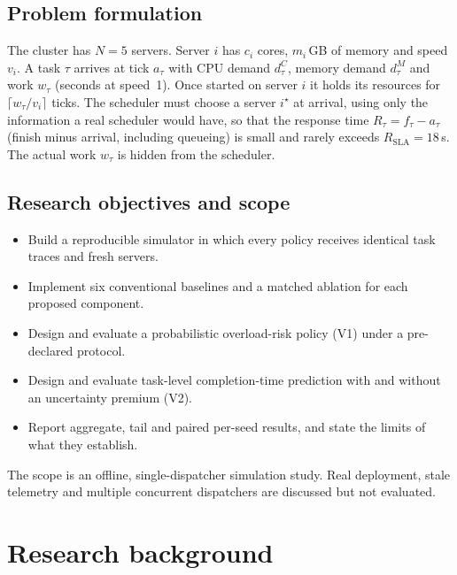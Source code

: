 \documentclass[11pt,a4paper]{article}
\begin{document}
\subsection{Problem formulation}
The cluster has $N=5$ servers. Server $i$ has $c_i$ cores, $m_i$\,GB of memory and speed $v_i$. A task
$\tau$ arrives at tick $a_\tau$ with CPU demand $d^{C}_\tau$, memory demand $d^{M}_\tau$ and work
$w_\tau$ (seconds at speed~1). Once started on server $i$ it holds its resources for
$\lceil w_\tau / v_i \rceil$ ticks. The scheduler must choose a server $i^\star$ at arrival, using only the
information a real scheduler would have, so that the response time $R_\tau = f_\tau - a_\tau$ (finish minus
arrival, including queueing) is small and rarely exceeds $R_{\mathrm{SLA}} = 18$\,s. The actual work
$w_\tau$ is hidden from the scheduler.

\subsection{Research objectives and scope}
\begin{itemize}
  \item Build a reproducible simulator in which every policy receives identical task traces and fresh servers.
  \item Implement six conventional baselines and a matched ablation for each proposed component.
  \item Design and evaluate a probabilistic overload-risk policy (V1) under a pre-declared protocol.
  \item Design and evaluate task-level completion-time prediction with and without an uncertainty premium (V2).
  \item Report aggregate, tail and paired per-seed results, and state the limits of what they establish.
\end{itemize}
The scope is an offline, single-dispatcher simulation study. Real deployment, stale telemetry and multiple
concurrent dispatchers are discussed but not evaluated.

\section{Research background}
\end{document}
